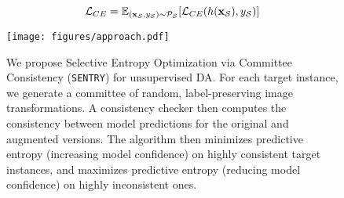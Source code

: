 \documentclass[10pt,twocolumn,letterpaper]{article}
\newcommand{\method}{\texttt{SENTRY}\xspace}
\newcommand{\source}{\mathcal{S}}  \newcommand{\target}{\mathcal{T}}  \newcommand{\numsamples}{N}
\begin{document}
\begin{equation}
    \vspace{-7pt}
    \mathcal{L}_{CE} = \mathbb{E}_{(\mathbf{x}_\source, y_\source) \sim \mathcal{P}_\source} [\mathcal{L}_{CE} (\model(\mathbf{x}_\source), y_\source)]    
    \label{eq:ce}
\end{equation}    
\vspace{-5pt}

\begin{figure*}[t]
    \centering
    \vspace{-2pt}
    \texttt{[image: figures/approach.pdf]}
    \vspace{-12pt}
    \caption{
    We propose Selective Entropy Optimization via Committee Consistency (\method) for unsupervised DA. For each target instance, we generate a committee of random, label-preserving image transformations. A consistency checker then computes the consistency between model predictions for the original and augmented versions. The algorithm then minimizes predictive entropy (increasing model confidence) on highly consistent target instances, and maximizes predictive entropy (reducing model confidence) on highly inconsistent ones.
    }
    \label{fig:approach}
    \vspace*{-10pt}
 \end{figure*}
\end{document}

